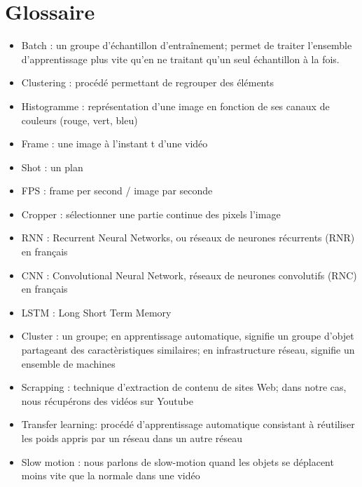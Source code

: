 \documentclass[11pt]{article}
\begin{document}
\newpage
\section{Glossaire}
\label{sec:org0d18543}
\begin{itemize}
\item Batch : un groupe d'échantillon d'entraînement; permet de traiter l'ensemble d'apprentissage plus vite qu'en ne traitant qu'un seul échantillon à la fois.\\
\item Clustering : procédé permettant de regrouper des éléments\\
\item Histogramme : représentation d'une image en fonction de ses canaux de couleurs (rouge, vert, bleu)\\
\item Frame : une image à l'instant t d'une vidéo\\
\item Shot : un plan\\
\item FPS : frame per second / image par seconde\\
\item Cropper : sélectionner une partie continue des pixels l'image\\
\item RNN : Recurrent Neural Networks, ou réseaux de neurones récurrents (RNR) en français\\
\item CNN : Convolutional Neural Network, réseaux de neurones convolutifs (RNC) en français\\
\item LSTM : Long Short Term Memory\\
\item Cluster : un groupe; en apprentissage automatique, signifie un groupe d'objet partageant des caractèristiques similaires; en infrastructure réseau, signifie un ensemble de machines\\
\item Scrapping : technique d'extraction de contenu de sites Web; dans notre cas, nous récupérons des vidéos sur Youtube\\
\item Transfer learning: procédé d'apprentissage automatique consistant à réutiliser les poids appris par un réseau dans un autre réseau\\
\item Slow motion : nous parlons de slow-motion quand les objets se déplacent moins vite que la normale dans une vidéo\\

\end{itemize}
\end{document}
